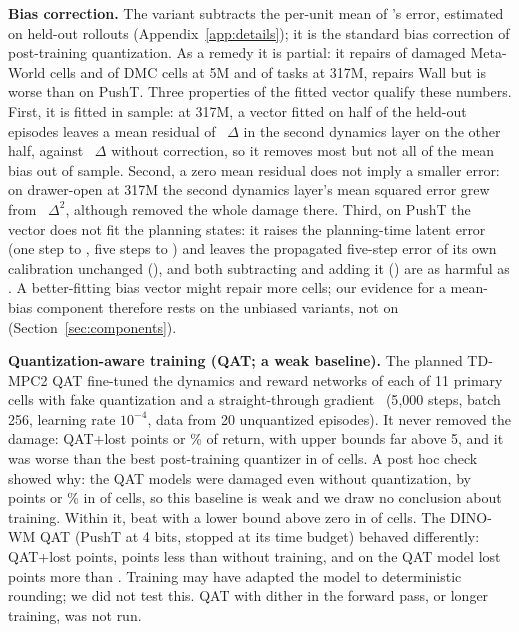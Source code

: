 \textbf{Bias correction.} The variant \detbc subtracts the per-unit mean of \dtm's error, estimated on held-out rollouts (Appendix~\ref{app:details}); it is the standard bias correction of post-training quantization. As a remedy it is partial: it repairs  of  damaged Meta-World cells and  of  DMC cells at 5M and  of  tasks at 317M, repairs Wall but is worse than \dtm on PushT. Three properties of the fitted vector qualify these numbers. First, it is fitted in sample: at 317M, a vector fitted on half of the held-out episodes leaves a mean residual of ~$\Delta$ in the second dynamics layer on the other half, against ~$\Delta$ without correction, so it removes most but not all of the mean bias out of sample. Second, a zero mean residual does not imply a smaller error: on drawer-open at 317M the second dynamics layer's mean squared error grew from ~$\Delta^2$, although \detbc removed the whole damage there. Third, on PushT the vector does not fit the planning states: it raises the planning-time latent error (one step  to , five steps  to ) and leaves the propagated five-step error of its own calibration unchanged (), and both subtracting and adding it (\shiterb) are as harmful as \dtm. A better-fitting bias vector might repair more cells; our evidence for a mean-bias component therefore rests on the unbiased variants, not on \detbc (Section~\ref{sec:components}).

\textbf{Quantization-aware training (QAT; a weak baseline).} The planned TD-MPC2 QAT fine-tuned the dynamics and reward networks of each of 11 primary cells with \dtm fake quantization and a straight-through gradient~\citep{bengio2013ste} (5{,}000 steps, batch 256, learning rate $10^{-4}$, data from 20 unquantized episodes). It never removed the damage: QAT+\dtm lost  points or \% of return, with upper bounds far above 5, and it was worse than the best post-training quantizer in  of  cells. A post hoc check showed why: the QAT models were damaged even without quantization, by  points or \% in  of  cells, so this baseline is weak and we draw no conclusion about training. Within it, \shiter beat \dtm with a lower bound above zero in  of  cells. The DINO-WM QAT (PushT at 4 bits, stopped at its time budget) behaved differently: QAT+\dtm lost  points,  points less than \dtm without training, and \shiter on the QAT model lost  points more than \dtm. Training may have adapted the model to deterministic rounding; we did not test this. QAT with dither in the forward pass, or longer training, was not run.

